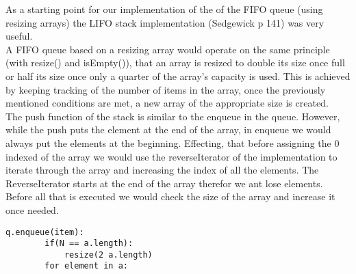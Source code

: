 \documentclass[a4paper]{article}
\begin{document}
\noindent
As a starting point for our implementation of the  of the FIFO queue (using resizing arrays) the LIFO stack implementation (Sedgewick p 141) was very useful.
\ \\

\noindent
A FIFO queue based on a resizing array would operate on the same principle (with resize() and isEmpty()), that an array is resized 
to double its size once full or half its size once only a quarter of the array's capacity is used. This is achieved by keeping tracking of 
the number of items in the array, once the previously mentioned conditions are met, a new array 
of the appropriate size is created.
\ \\

\noindent
The push function of the stack is similar to the enqueue in the queue. However, while the push puts the element at the end of the array, in enqueue we would always put the elements at the beginning. Effecting, that before assigning  the 0 indexed of the array we would use the reverseIterator of the implementation to iterate through the array and increasing the index of all the elements. The ReverseIterator starts at the end of the array therefor we ant lose elements.
\ \\

\noindent
Before all that is executed we would check the size of the array and increase it once needed.

\begin{lstlisting}[escapeinside={{*}{*}}]
    q.enqueue(item):
    	if(N == a.length):
    		resize(2 a.length)
    	for element in a:
    		
\end{lstlisting}
\end{document}
